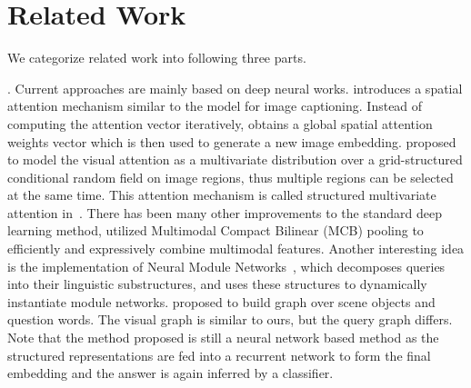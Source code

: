 \section{Related Work}
\label{sec-related-work}
\hspace{-2ex}
We categorize related work into following three parts. %


. Current \vqa approaches are mainly based on deep neural works.  \cite{zhu2016visual7w} introduces a spatial attention mechanism similar to the model for image captioning. %
Instead of computing the attention vector iteratively, \cite{xu2016ask} obtains a global spatial attention weights vector which is then used to generate a new image embedding. \cite{zhu2017structured} proposed to model the visual attention as a multivariate distribution over a grid-structured conditional random field on image regions, thus multiple regions can be selected at the same time. This attention mechanism is called structured multivariate attention in~\cite{zhu2017structured}.
There has been many other improvements to the standard deep learning method, \eg %
\cite{fukui2016multimodal} utilized Multimodal Compact Bilinear (MCB) pooling to efficiently and expressively combine multimodal features. Another interesting idea is the implementation of Neural Module Networks~\cite{Andreas_2016,hu2017learning}, which decomposes queries into their linguistic substructures, and uses these structures to dynamically instantiate module networks. %
\cite{teney2017graph} proposed to build graph over scene objects and question words. The visual graph is similar to ours, but the query graph differs. %
Note that the method \cite{teney2017graph} proposed is still a neural network based method as the structured representations are fed into a recurrent network to form the final embedding and the answer is again inferred by a classifier. %


